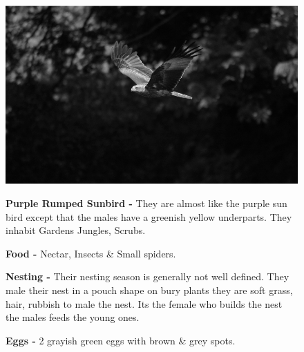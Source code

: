 \begin{figure}[H]
\begin{center}
\includegraphics{figure/Land_birds/01_pariah_kite/pariah-kite.eps}
\end{center}
\medskip
\noindent
{\bf Purple Rumped Sunbird -} They are almost like the purple sun bird except that the males have a greenish yellow underparts. They inhabit Gardens Jungles, Scrubs.

\medskip
{\bf Food -} Nectar, Insects \& Small spiders.

{\bf Nesting -} Their nesting season is generally not well defined. They male their nest in a pouch shape on bury plants they are soft grass, hair, rubbish to male the nest. Its the female who builds the nest the males feeds the young ones.

{\bf Eggs -} 2 grayish green eggs with brown \& grey spots.
\end{figure}

\vfill\eject

~\phantom{a}
\vfill

